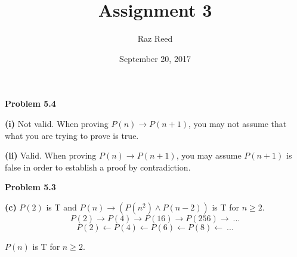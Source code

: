 \documentclass[fleqn]{article}
\title{Assignment 3}
\author{Raz Reed}
\date{September 20, 2017}
\begin{document}
\maketitle

\newpage
{\noindent\Large\bf Problem 5.4}\vspace{1em}\par
\textbf{(i)} Not valid. When proving $P(n) \rightarrow P(n+1)$, you may not assume that what you are trying to prove is true.\par
\textbf{(ii)} Valid. When proving $P(n) \rightarrow P(n+1)$, you may assume $P(n+1)$ is false in order to establish a proof by contradiction.

\newpage
{\noindent\Large\bf Problem 5.3}\vspace{1em}\par
\textbf{(c)} $P(2)$ is T and $P(n) \rightarrow (P(n^2) \land P(n-2))$ is T for $n \geq 2$.
\begin{equation*}
	P(2) \rightarrow P(4) \rightarrow P(16) \rightarrow P(256) \rightarrow\ ...
\end{equation*}
\begin{equation*}
	P(2) \leftarrow P(4) \leftarrow P(6) \leftarrow P(8) \leftarrow\ ...
\end{equation*}
\par$P(n)$ is T for $n \geq 2$.
\end{document}
